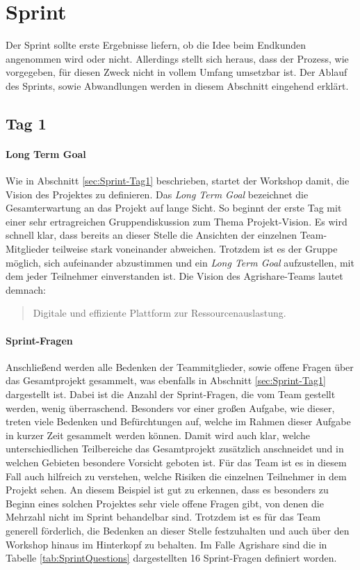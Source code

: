 \section{Sprint}
\label{sec:Sprint-Umsetzung}
Der Sprint sollte erste Ergebnisse liefern, ob die Idee beim Endkunden angenommen wird oder nicht. Allerdings stellt sich heraus, dass der Prozess, wie vorgegeben, für diesen Zweck nicht in vollem Umfang umsetzbar ist. Der Ablauf des Sprints, sowie Abwandlungen werden in diesem Abschnitt eingehend erklärt.
\subsection*{\label{sec:Sprint-Umsetzung-Tag1}\thesubsection\quad Tag 1}
\paragraph{Long Term Goal}
Wie in Abschnitt \ref{sec:Sprint-Tag1} beschrieben, startet der Workshop damit, die Vision des Projektes zu definieren. Das \textit{Long Term Goal} bezeichnet die Gesamterwartung an das Projekt auf lange Sicht. So beginnt der erste Tag mit einer sehr ertragreichen Gruppendiskussion zum Thema Projekt-Vision. Es wird schnell klar, dass bereits an dieser Stelle die Ansichten der einzelnen Team-Mitglieder teilweise stark voneinander abweichen. Trotzdem ist es der Gruppe möglich, sich aufeinander abzustimmen und ein \textit{Long Term Goal} aufzustellen, mit dem jeder Teilnehmer einverstanden ist. Die Vision des Agrishare-Teams lautet demnach:
\begin{quote}
Digitale und effiziente Plattform zur Ressourcenauslastung.
\end{quote}
\paragraph{Sprint-Fragen}
Anschließend werden alle Bedenken der Teammitglieder, sowie offene Fragen über das Gesamtprojekt gesammelt, was ebenfalls in Abschnitt \ref{sec:Sprint-Tag1} dargestellt ist. 
Dabei ist die Anzahl der Sprint-Fragen, die vom Team gestellt werden, wenig überraschend. Besonders vor einer großen Aufgabe, wie dieser, treten viele Bedenken und Befürchtungen auf, welche im Rahmen dieser Aufgabe in kurzer Zeit gesammelt werden können. Damit wird auch klar, welche unterschiedlichen Teilbereiche das Gesamtprojekt zusätzlich anschneidet und in welchen Gebieten besondere Vorsicht geboten ist. Für das Team ist es in diesem Fall auch hilfreich zu verstehen, welche Risiken die einzelnen Teilnehmer in dem Projekt sehen. An diesem Beispiel ist gut zu erkennen, dass es besonders zu Beginn eines solchen Projektes sehr viele offene Fragen gibt, von denen die Mehrzahl nicht im Sprint behandelbar sind. Trotzdem ist es für das Team generell förderlich, die Bedenken an dieser Stelle festzuhalten und auch über den Workshop hinaus im Hinterkopf zu behalten. Im Falle Agrishare sind die in Tabelle \ref{tab:SprintQuestions} dargestellten 16 Sprint-Fragen definiert worden.

